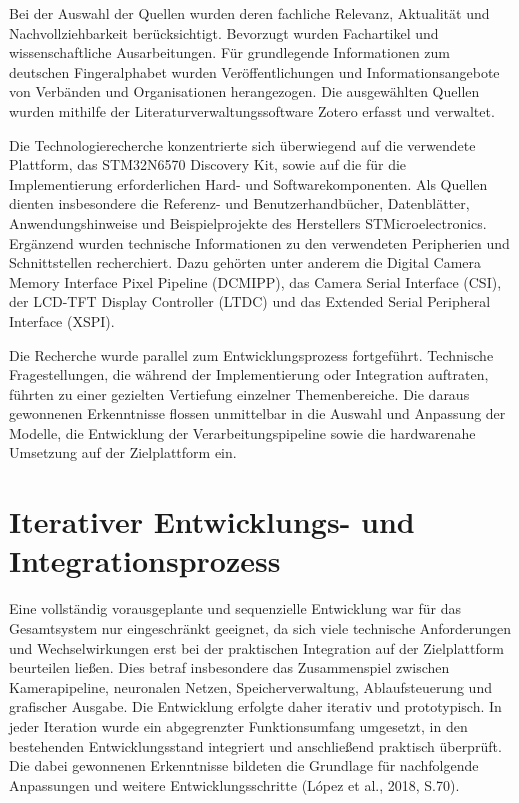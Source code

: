 Bei der Auswahl der Quellen wurden deren fachliche Relevanz, Aktualität und Nachvollziehbarkeit berücksichtigt. Bevorzugt wurden Fachartikel und wissenschaftliche Ausarbeitungen. Für grundlegende Informationen zum deutschen Fingeralphabet wurden Veröffentlichungen und Informationsangebote von Verbänden und Organisationen herangezogen. Die ausgewählten Quellen wurden mithilfe der Literaturverwaltungssoftware Zotero erfasst und verwaltet.

Die Technologierecherche konzentrierte sich überwiegend auf die verwendete Plattform, das STM32N6570 Discovery Kit, sowie auf die für die Implementierung erforderlichen Hard- und Softwarekomponenten. Als Quellen dienten insbesondere die Referenz- und Benutzerhandbücher, Datenblätter, Anwendungshinweise und Beispielprojekte des Herstellers STMicroelectronics. Ergänzend wurden technische Informationen zu den verwendeten Peripherien und Schnittstellen recherchiert. Dazu gehörten unter anderem die Digital Camera Memory Interface Pixel Pipeline (DCMIPP), das Camera Serial Interface (CSI), der LCD-TFT Display Controller (LTDC) und das Extended Serial Peripheral Interface (XSPI).

Die Recherche wurde parallel zum Entwicklungsprozess fortgeführt. Technische Fragestellungen, die während der Implementierung oder Integration auftraten, führten zu einer gezielten Vertiefung einzelner Themenbereiche. Die daraus gewonnenen Erkenntnisse flossen unmittelbar in die Auswahl und Anpassung der Modelle, die Entwicklung der Verarbeitungspipeline sowie die hardwarenahe Umsetzung auf der Zielplattform ein.

\section{Iterativer Entwicklungs- und Integrationsprozess}

Eine vollständig vorausgeplante und sequenzielle Entwicklung war für das Gesamtsystem nur eingeschränkt geeignet, da sich viele technische Anforderungen und Wechselwirkungen erst bei der praktischen Integration auf der Zielplattform beurteilen ließen. Dies betraf insbesondere das Zusammenspiel zwischen Kamerapipeline, neuronalen Netzen, Speicherverwaltung, Ablaufsteuerung und grafischer Ausgabe. Die Entwicklung erfolgte daher iterativ und prototypisch. In jeder Iteration wurde ein abgegrenzter Funktionsumfang umgesetzt, in den bestehenden Entwicklungsstand integriert und anschließend praktisch überprüft. Die dabei gewonnenen Erkenntnisse bildeten die Grundlage für nachfolgende Anpassungen und weitere Entwicklungsschritte (López et al., 2018, S.70).

